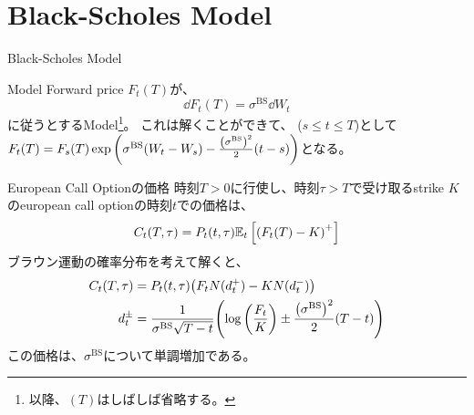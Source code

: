 \documentclass[dvipdfmx,9pt]{beamer}
\begin{document}
\section{Black-Scholes Model}
\begin{frame}{Black-Scholes Model}
  \begin{block}{Model}
    Forward price $F_{t}(T)$が、
    \begin{equation}
      \dd F_{t}(T) = \sigma^{\mathrm{BS}} \dd W_{t}
    \end{equation}
    に従うとするModel\footnote{以降、$(T)$はしばしば省略する。}。
    これは解くことができて、 ($s \leq t\leq T$)として$F_{t}(T) = F_{s}(T)\expi{\sigma^{\mathrm{BS}}(W_{t} - W_{s})-\frac{\pqty{\sigma^{\mathrm{BS}}}^{2}}{2}(t-s)}$となる。
  \end{block}
  \begin{block}{European Call Optionの価格}
    時刻$T>0$に行使し、時刻$\tau >T$で受け取るstrike $K$のeuropean call optionの時刻$t$での価格は、
    \begin{equation}
      C_{t}(T,\tau) = P_{t}(t,\tau)\exv[t]{\pqty{F_{t}(T) - K}^{+}}
    \end{equation}
    ブラウン運動の確率分布を考えて解くと、
    \begin{align}
      C_{t}(T,\tau) & = P_{t}(t,\tau) \pqty{F_{t} N(d_{t}^{+}) - KN(d_{t}^{-})}                                                                    \\
      d_{t}^{\pm}   & = \frac{1}{\sigma^{\mathrm{BS}}\sqrt{T-t}}\pqty{\log\pqty{\frac{F_{t}}{K}}\pm\frac{\pqty{\sigma^{\mathrm{BS}}}^{2}}{2}(T-t)}
    \end{align}
    この価格は、$\sigma^{\mathrm{BS}}$について単調増加である。
  \end{block}
\end{frame}
\end{document}
